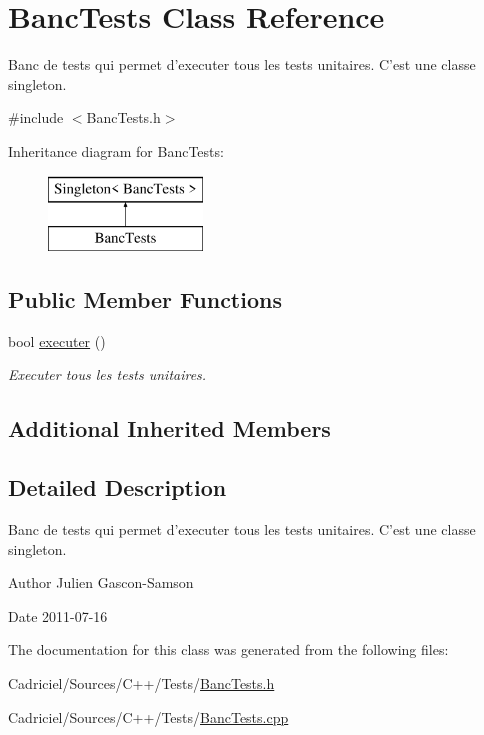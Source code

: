 \hypertarget{class_banc_tests}{\section{Banc\-Tests Class Reference}
\label{class_banc_tests}
}


Banc de tests qui permet d'executer tous les tests unitaires. C'est une classe singleton.  




{\ttfamily \#include $<$Banc\-Tests.\-h$>$}

Inheritance diagram for Banc\-Tests\-:\begin{figure}[H]
\begin{center}
\leavevmode
\includegraphics[height=2.000000cm]{class_banc_tests}
\end{center}
\end{figure}
\subsection*{Public Member Functions}
\begin{DoxyCompactItemize}
\item 
bool \hyperlink{group__inf2990_gab5d7fbfe7e3fbe00aa187caa10b1c506}{executer} ()
\begin{DoxyCompactList}\small\item\em Executer tous les tests unitaires. \end{DoxyCompactList}\end{DoxyCompactItemize}
\subsection*{Additional Inherited Members}


\subsection{Detailed Description}
Banc de tests qui permet d'executer tous les tests unitaires. C'est une classe singleton. 

\begin{DoxyAuthor}{Author}
Julien Gascon-\/\-Samson 
\end{DoxyAuthor}
\begin{DoxyDate}{Date}
2011-\/07-\/16 
\end{DoxyDate}


The documentation for this class was generated from the following files\-:\begin{DoxyCompactItemize}
\item 
Cadriciel/\-Sources/\-C++/\-Tests/\hyperlink{_banc_tests_8h}{Banc\-Tests.\-h}\item 
Cadriciel/\-Sources/\-C++/\-Tests/\hyperlink{_banc_tests_8cpp}{Banc\-Tests.\-cpp}\end{DoxyCompactItemize}
